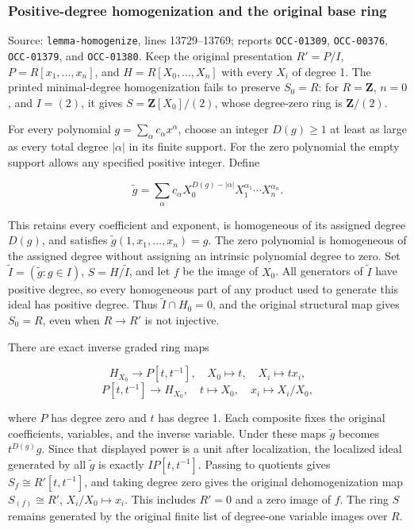 \subsubsection{Positive-degree homogenization and the original base ring}\label{algebra-proof-002-positive-degree-homogenization-and-the-original-base-ring}

Source: \texttt{lemma-\AlgebraIdentifierBreak{}homogenize}, lines 13729--13769; reports \texttt{OCC-01309}, \texttt{OCC-00376}, \texttt{OCC-01379}, and \texttt{OCC-01380}. Keep the original presentation \(R'=P/I\), \(P=R[x_1,\ldots,x_n]\), and \(H=R[X_0,\ldots,X_n]\) with every \(X_i\) of degree 1. The printed minimal-degree homogenization fails to preserve \(S_0=R\): for \(R=\mathbf Z\), \(n=0\), and \(I=(2)\), it gives \(S=\mathbf Z[X_0]/(2)\), whose degree-zero ring is \(\mathbf Z/(2)\).

For every polynomial \(g=\sum_\alpha c_\alpha x^\alpha\), choose an integer \(D(g)\geq1\) at least as large as every total degree \(|\alpha|\) in its finite support. For the zero polynomial the empty support allows any specified positive integer. Define

\[
\widetilde g=\sum_\alpha c_\alpha
 X_0^{D(g)-|\alpha|}X_1^{\alpha_1}\cdots X_n^{\alpha_n}.
\]

This retains every coefficient and exponent, is homogeneous of its assigned degree \(D(g)\), and satisfies \(\widetilde g(1,x_1,\ldots,x_n)=g\). The zero polynomial is homogeneous of the assigned degree without assigning an intrinsic polynomial degree to zero. Set \(\widetilde I=(\widetilde g:g\in I)\), \(S=H/\widetilde I\), and let \(f\) be the image of \(X_0\). All generators of \(\widetilde I\) have positive degree, so every homogeneous part of any product used to generate this ideal has positive degree. Thus \(\widetilde I\cap H_0=0\), and the original structural map gives \(S_0=R\), even when \(R\to R'\) is not injective.

There are exact inverse graded ring maps

\[
H_{X_0}\longrightarrow P[t,t^{-1}],\quad X_0\mapsto t,\quad X_i\mapsto t x_i,
\] \[
P[t,t^{-1}]\longrightarrow H_{X_0},\quad t\mapsto X_0,\quad x_i\mapsto X_i/X_0,
\]

where \(P\) has degree zero and \(t\) has degree 1. Each composite fixes the original coefficients, variables, and the inverse variable. Under these maps \(\widetilde g\) becomes \(t^{D(g)}g\). Since that displayed power is a unit after localization, the localized ideal generated by all \(\widetilde g\) is exactly \(I P[t,t^{-1}]\). Passing to quotients gives \(S_f\cong R'[t,t^{-1}]\), and taking degree zero gives the original dehomogenization map \(S_{(f)}\cong R'\), \(X_i/X_0\mapsto x_i\). This includes \(R'=0\) and a zero image of \(f\). The ring \(S\) remains generated by the original finite list of degree-one variable images over \(R\).

